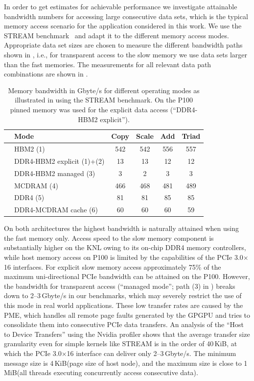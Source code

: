 \documentclass[letterpaper]{llncs}
\newcommand{\byte}{\mbox{byte}\xspace}
\newcommand{\second}{\mbox{s}\xspace}
\newcommand{\GBS}{\mbox{G\byte/\second}\xspace}
\newcommand{\MiB}{\mbox{MiB}\xspace}
\newcommand{\KiB}{\mbox{KiB}\xspace}
\begin{document}
In order to get estimates for achievable performance we investigate attainable bandwidth numbers for accessing large consecutive data sets, which is the typical memory access scenario for the application considered in this work. We use the STREAM benchmark~\cite{McCalpin95} and adapt it to the different memory access modes. Appropriate data set sizes are chosen to measure the different bandwidth paths shown in , i.e., for transparent access to the slow memory we use data sets larger than the fast memories. The measurements for all relevant data path combinations are shown in .
\begin{table}[b]
\centering
\begin{tabular}{llcccc}
    & \textbf{Mode} & \textbf{Copy} & \textbf{Scale} & \textbf{Add} &
    \textbf{Triad} \\
    \hline
    \parbox[t]{4mm}{} 
    & HBM2 (1) & 542 & 542 & 556 & 557 \\
    & DDR4-HBM2 explicit (1)+(2) & 13 & 13 & 12 & 12 \\
    & DDR4-HBM2 managed (3) & 3 & 2 & 3 & 3 \\
    \hline
    \parbox[t]{4mm}{} 
    & MCDRAM (4) & 466 & 468 & 481 & 489 \\
    & DDR4 (5) & 81 & 81 & 85 & 85 \\
    & DDR4-MCDRAM cache (6) & 60 & 60 & 60 & 59 \\
\end{tabular}\smallskip
\caption{Memory bandwidth in \GBS for different operating modes as illustrated in
 using the STREAM benchmark. On the P100 pinned memory was used for the explicit data access (``DDR4-HBM2 explicit'').}
\label{tab:mem}
\end{table} 
On both architectures the highest bandwidth is naturally attained when using the fast memory only. Access speed to the slow memory component is substantially higher on the KNL owing to its on-chip DDR4 memory controllers, while host memory access on P100 is limited by the capabilities of the PCIe 3.0$\times$16 interfaces. For explicit slow memory access approximately 75\% of the maximum uni-directional PCIe bandwidth can be attained on the P100. However, the bandwidth for transparent access (``managed mode''; path (3) in ) breaks down to 2--3\,\GBS in our benchmarks, which may severely restrict the use of this mode in real world applications. These low transfer rates are caused by the PME, which handles all remote page faults generated by the GPGPU and tries to consolidate them into consecutive PCIe data transfers. An analysis of the ``Host to Device Transfers'' using the Nvidia profiler shows that the average transfer size granularity even for simple kernels like STREAM is in the order of 40\,\KiB, at which the  PCIe 3.0$\times$16 interface can deliver only 2--3\,\GBS. The minimum message size is 4\,\KiB (page size of host node), and the maximum size is close to 1\,\MiB (all threads executing concurrently access consecutive data). 
\end{document}
